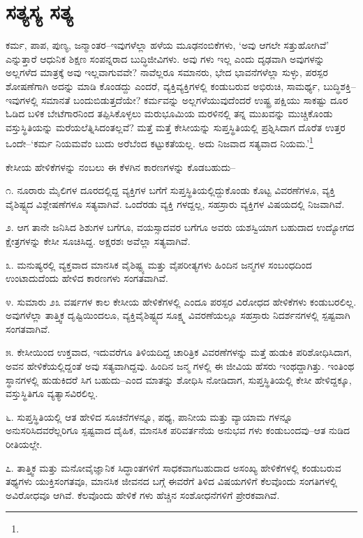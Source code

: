 \section{ಸತ್ಯಸ್ಯ ಸತ್ಯ}

ಕರ್ಮ, ಪಾಪ, ಪುಣ್ಯ, ಜನ್ಮಾಂತರ–ಇವುಗಳೆಲ್ಲಾ ಹಳೆಯ ಮೂಢನಂಬಿಕೆಗಳು, ‘ಅವು ಆಗಲೇ ಸತ್ತುಹೋಗಿವೆ’ ಎನ್ನುತ್ತಾರೆ ಆಧುನಿಕ ಶಿಕ್ಷಣ ಸಂಪನ್ನರಾದ ಬುದ್ಧಿಜೀವಿಗಳು. ಅವು ಗಳು ಇಲ್ಲ ಎಂದು ದೃಢವಾಗಿ ಅವುಗಳನ್ನು ಅಲ್ಲಗಳೆದ ಮಾತ್ರಕ್ಕೆ ಅವು ಇಲ್ಲವಾಗುವವೇ? ನಾವೆಲ್ಲರೂ ಸಮಾನರು, ಭೇದ ಭಾವನೆಗಳೆಲ್ಲಾ ಸುಳ್ಳು, ಪರಸ್ಪರ ಶೋಷಣೆಗಾಗಿ ಅದನ್ನು ಮಾಡಿ ಕೊಂಡದ್ದು ಎಂದರೆ, ವ್ಯಕ್ತಿವ್ಯಕ್ತಿಗಳಲ್ಲಿ ಕಂಡುಬರುವ ಅಭಿರುಚಿ, ಸಾಮರ್ಥ್ಯ, ಬುದ್ಧಿಶಕ್ತಿ– ಇವುಗಳಲ್ಲಿ ಸಮಾನತೆ ಬಂದುಬಿಡುತ್ತದೆಯೇ? ಕರ್ಮವನ್ನು ಅಲ್ಲಗಳೆಯುವುದೆಂದರೆ ಉಷ್ಟ್ರ ಪಕ್ಷಿಯು ಸಾಕಷ್ಟು ದೂರ ಓಡಿದ ಬಳಿಕ ಬೇಟೆಗಾರನಿಂದ ತಪ್ಪಿಸಿಕೊಳ್ಳಲು ಮರುಭೂಮಿಯ ಮರಳಿನಲ್ಲಿ ತನ್ನ ಮುಖವನ್ನು ಮುಚ್ಚಿಕೊಂಡು ವಸ್ತುಸ್ಥಿತಿಯನ್ನು ಮರೆಯಲೆತ್ನಿಸಿದಂತಲ್ಲವೆ? ಮತ್ತೆ ಮತ್ತೆ ಕೇಸೀಯನ್ನು ಸುಪ್ತಸ್ಥಿತಿಯಲ್ಲಿ ಪ್ರಶ್ನಿಸಿದಾಗ ದೊರೆತ ಉತ್ತರ ಒಂದೇ–‘ಕರ್ಮ ನಿಯಮವೆಂ ಬುದು ಅರೆಬೆಂದ ಕಟ್ಟುಕತೆಯಲ್ಲ. ಅದು ನಿಜವಾದ ಸತ್ಯವಾದ ನಿಯಮ.’\footnote{}

ಕೇಸೀಯ ಹೇಳಿಕೆಗಳನ್ನು ನಂಬಲು ಈ ಕೆಳಗಿನ ಕಾರಣಗಳನ್ನು ಕೊಡಬಹುದು–

೧. ನೂರಾರು ಮೈಲಿಗಳ ದೂರದಲ್ಲಿದ್ದ ವ್ಯಕ್ತಿಗಳ ಬಗೆಗೆ ಸುಪ್ತಸ್ಥಿತಿಯಲ್ಲಿದ್ದುಕೊಂಡು ಕೊಟ್ಟ ವಿವರಣೆಗಳೂ, ವ್ಯಕ್ತಿ ವೈಶಿಷ್ಟ್ಯದ ವಿಶ್ಲೇಷಣೆಗಳೂ ಸತ್ಯವಾಗಿವೆ. ಒಂದೆರಡು ವ್ಯಕ್ತಿ ಗಳದ್ದಲ್ಲ, ಸಹಸ್ರಾರು ವ್ಯಕ್ತಿಗಳ ವಿಷಯದಲ್ಲಿ ನಿಜವಾಗಿವೆ.

೨. ಆಗ ತಾನೇ ಜನಿಸಿದ ಶಿಶುಗಳ ಬಗೆಗೂ, ವಯಸ್ಸಾದವರ ಬಗೆಗೂ ಅವರು ಯಶಸ್ವಿಯಾಗ ಬಹುದಾದ ಉದ್ಯೋಗದ ಕ್ಷೇತ್ರಗಳನ್ನು ಕೇಸೀ ಸೂಚಿಸಿದ್ದ. ಅಕ್ಷರಶಃ ಅವೆಲ್ಲಾ ಸತ್ಯವಾಗಿವೆ.

೩. ಮನುಷ್ಯರಲ್ಲಿ ವ್ಯಕ್ತವಾದ ಮಾನಸಿಕ ವೈಶಿಷ್ಟ್ಯ ಮತ್ತು ವೈಪರೀತ್ಯಗಳು ಹಿಂದಿನ ಜನ್ಮಗಳ ಸಂಬಂಧದಿಂದ ಉಂಟಾದುದೆಂದು ಹೇಳಿದ ಕಾರಣಗಳು ಸಂಗತವಾಗಿವೆ.

೪. ಸುಮಾರು ೨೩ ವರ್ಷಗಳ ಕಾಲ ಕೇಸೀಯ ಹೇಳಿಕೆಗಳಲ್ಲಿ ಎಂದೂ ಪರಸ್ಪರ ವಿರೋಧದ ಹೇಳಿಕೆಗಳು ಕಂಡುಬರಲಿಲ್ಲ. ಅವುಗಳೆಲ್ಲಾ ತಾತ್ತ್ವಿಕ ದೃಷ್ಟಿಯಿಂದಲೂ, ವ್ಯಕ್ತಿವೈಶಿಷ್ಟ್ಯದ ಸೂಕ್ಷ್ಮ ವಿವರಣೆಯಲ್ಲೂ ಸಹಸ್ರಾರು ನಿದರ್ಶನಗಳಲ್ಲಿ ಸ್ಪಷ್ಟವಾಗಿ ಸಂಗತವಾಗಿವೆ.

೫. ಕೇಸೀಯಿಂದ ಉಕ್ತವಾದ, ಇದುವರೆಗೂ ತಿಳಿಯದಿದ್ದ ಚಾರಿತ್ರಿಕ ವಿವರಣೆಗಳನ್ನು ಮತ್ತೆ ಹುಡುಕಿ ಪರಿಶೋಧಿಸಿದಾಗ, ಅವನ ಹೇಳಿಕೆಯಲ್ಲಿದ್ದಂತೆ ಅವು ಸತ್ಯವಾಗಿದ್ದವು. ಹಿಂದಿನ ಜನ್ಮ ಗಳಲ್ಲಿ ಈ ಜೀವಿಯ ಹೆಸರು ಇಂಥದ್ದಾಗಿತ್ತು. ಇಂತಿಂಥ ಸ್ಥಾನಗಳಲ್ಲಿ ಹುಡುಕಿದರೆ ಸಿಗ ಬಹುದು–ಎಂದ ಮಾತನ್ನು ಶೋಧಿಸಿ ನೋಡಿದಾಗ, ಸುಪ್ತಸ್ಥಿತಿಯಲ್ಲಿ ಕೇಸೀ ಹೇಳಿದ್ದಕ್ಕೂ, ವಸ್ತುಸ್ಥಿತಿಗೂ ವ್ಯತ್ಯಾಸವಿರಲಿಲ್ಲ.

೬. ಸುಪ್ತಸ್ಥಿತಿಯಲ್ಲಿ ಆತ ಹೇಳಿದ ಸೂಚನೆಗಳನ್ನೂ, ಪಥ್ಯ, ಪಾನೀಯ ಮತ್ತು ವ್ಯಾಯಾಮ ಗಳನ್ನೂ ಅನುಸರಿಸಿದವರೆಲ್ಲರಿಗೂ ಸ್ಪಷ್ಟವಾದ ದೈಹಿಕ, ಮಾನಸಿಕ ಪರಿವರ್ತನೆಯ ಅನುಭವ ಗಳು ಕಂಡುಬಂದವು–ಆತ ನುಡಿದ ರೀತಿಯಲ್ಲೇ.

೭. ತಾತ್ತ್ವಿಕ ಮತ್ತು ಮನೋವೈಜ್ಞಾನಿಕ ಸಿದ್ಧಾಂತಗಳಿಗೆ ಸಾಧಕವಾಗಬಹುದಾದ ಅಸಂಖ್ಯ ಹೇಳಿಕೆಗಳಲ್ಲಿ ಕಂಡುಬರುವ ತಥ್ಯಗಳು ಯುಕ್ತಿಸಂಗತವೂ, ಮಾನಸಿಕ ಜೀವನದ ಬಗ್ಗೆ ಈವರೆಗೆ ತಿಳಿದ ವಿಷಯಗಳಿಗೆ ಕೆಲವೊಂದು ಸಂಗತಿಗಳಲ್ಲಿ ಅವಿರೋಧವೂ ಆಗಿವೆ. ಕೆಲವೊಂದು ಹೇಳಿಕೆ ಗಳು ಹೆಚ್ಚಿನ ಸಂಶೋಧನೆಗಳಿಗೆ ಪ್ರೇರಕವಾಗಿವೆ.

